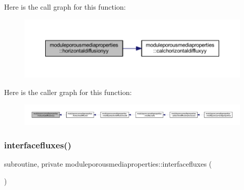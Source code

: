 Here is the call graph for this function\+:\nopagebreak
\begin{figure}[H]
\begin{center}
\leavevmode
\includegraphics[width=350pt]{namespacemoduleporousmediaproperties_a9bd1af2c6e3a19167f538d7c25d74e6b_cgraph}
\end{center}
\end{figure}
Here is the caller graph for this function\+:\nopagebreak
\begin{figure}[H]
\begin{center}
\leavevmode
\includegraphics[width=350pt]{namespacemoduleporousmediaproperties_a9bd1af2c6e3a19167f538d7c25d74e6b_icgraph}
\end{center}
\end{figure}
\mbox{\label{namespacemoduleporousmediaproperties_a9754a9e3d41ba3152a613bda8646ffae}} 
\subsubsection{\texorpdfstring{interfacefluxes()}{interfacefluxes()}}
{\footnotesize\ttfamily subroutine, private moduleporousmediaproperties\+::interfacefluxes (\begin{DoxyParamCaption}{ }\end{DoxyParamCaption})\hspace{0.3cm}{\ttfamily [private]}}

